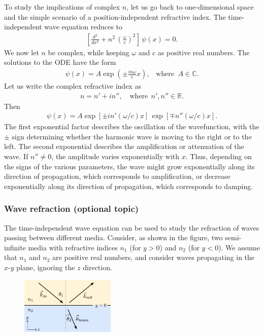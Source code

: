 \documentclass[10pt,a4paper]{article}
\begin{document}
To study the implications of complex $n$, let us go back to
one-dimensional space and the simple scenario of a
position-independent refractive index. The time-independent wave
equation reduces to
\begin{align}
  \left[\frac{d^2}{d x^2} + n^2\, \left(\frac{\omega}{c}\right)^2\right] \, \psi(x) = 0.
\end{align}
We now let $n$ be complex, while keeping $\omega$ and $c$ as positive
real numbers. The solutions to the ODE have the form
\begin{align}
  \psi(x) = A \exp\left(\pm \frac{in\omega}{c}x\right),\;\;\;\mathrm{where}\;\; A \in \mathbb{C}.
  \label{eq:gainloss-wave}
\end{align}
Let us write the complex refractive index as
\begin{align}
  n = n' + i n'',\quad \textrm{where}\;\, n',n'' \in \mathbb{R}.
\end{align}
Then
\begin{align}
  \psi(x) = A \exp\left[\pm in'(\omega/c)x\right]\, \exp\left[\mp n''(\omega/c)x\right].
\end{align}
The first exponential factor describes the oscillation of the
wavefunction, with the $\pm$ sign determining whether the harmonic
wave is moving to the right or to the left. The second exponential
describes the amplification or attenuation of the wave.  If $n'' \ne
0$, the amplitude varies exponentially with $x$. Thus, depending on
the signs of the various parameters, the wave might grow exponentially
along its direction of propagation, which corresponds to
amplification, or decrease exponentially along its direction of
propagation, which corresponds to damping.

\subsubsection{Wave refraction (optional topic)}

The time-independent wave equation can be used to study the refraction
of waves passing between different media.  Consider, as shown in the
figure, two semi-infinite media with refractive indices $n_1$ (for $y
> 0$) and $n_2$ (for $y < 0$).  We assume that $n_1$ and $n_2$ are
positive real numbers, and consider waves propagating in the $x$-$y$
plane, ignoring the $z$ direction.

\begin{figure}[h]
  \centering\includegraphics[width=0.4\textwidth]{refraction}
\end{figure}
\end{document}
